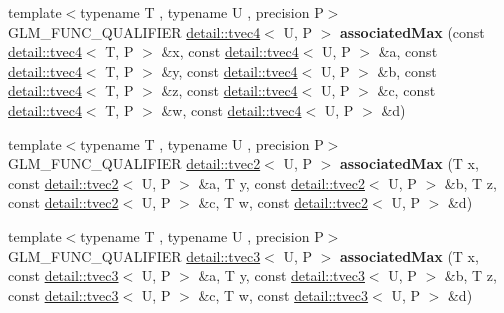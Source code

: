 \begin{DoxyCompactItemize}
\item 
{\footnotesize template$<$typename T , typename U , precision P$>$ }\\G\+L\+M\+\_\+\+F\+U\+N\+C\+\_\+\+Q\+U\+A\+L\+I\+F\+I\+ER \hyperlink{structglm_1_1detail_1_1tvec4}{detail\+::tvec4}$<$ U, P $>$ {\bfseries associated\+Max} (const \hyperlink{structglm_1_1detail_1_1tvec4}{detail\+::tvec4}$<$ T, P $>$ \&x, const \hyperlink{structglm_1_1detail_1_1tvec4}{detail\+::tvec4}$<$ U, P $>$ \&a, const \hyperlink{structglm_1_1detail_1_1tvec4}{detail\+::tvec4}$<$ T, P $>$ \&y, const \hyperlink{structglm_1_1detail_1_1tvec4}{detail\+::tvec4}$<$ U, P $>$ \&b, const \hyperlink{structglm_1_1detail_1_1tvec4}{detail\+::tvec4}$<$ T, P $>$ \&z, const \hyperlink{structglm_1_1detail_1_1tvec4}{detail\+::tvec4}$<$ U, P $>$ \&c, const \hyperlink{structglm_1_1detail_1_1tvec4}{detail\+::tvec4}$<$ T, P $>$ \&w, const \hyperlink{structglm_1_1detail_1_1tvec4}{detail\+::tvec4}$<$ U, P $>$ \&d)\hypertarget{namespaceglm_aa9c28699144939e12f1b1261b1939688}{}\label{namespaceglm_aa9c28699144939e12f1b1261b1939688}

\item 
{\footnotesize template$<$typename T , typename U , precision P$>$ }\\G\+L\+M\+\_\+\+F\+U\+N\+C\+\_\+\+Q\+U\+A\+L\+I\+F\+I\+ER \hyperlink{structglm_1_1detail_1_1tvec2}{detail\+::tvec2}$<$ U, P $>$ {\bfseries associated\+Max} (T x, const \hyperlink{structglm_1_1detail_1_1tvec2}{detail\+::tvec2}$<$ U, P $>$ \&a, T y, const \hyperlink{structglm_1_1detail_1_1tvec2}{detail\+::tvec2}$<$ U, P $>$ \&b, T z, const \hyperlink{structglm_1_1detail_1_1tvec2}{detail\+::tvec2}$<$ U, P $>$ \&c, T w, const \hyperlink{structglm_1_1detail_1_1tvec2}{detail\+::tvec2}$<$ U, P $>$ \&d)\hypertarget{namespaceglm_aaa37fcc1597ced974a35c9765128c888}{}\label{namespaceglm_aaa37fcc1597ced974a35c9765128c888}

\item 
{\footnotesize template$<$typename T , typename U , precision P$>$ }\\G\+L\+M\+\_\+\+F\+U\+N\+C\+\_\+\+Q\+U\+A\+L\+I\+F\+I\+ER \hyperlink{structglm_1_1detail_1_1tvec3}{detail\+::tvec3}$<$ U, P $>$ {\bfseries associated\+Max} (T x, const \hyperlink{structglm_1_1detail_1_1tvec3}{detail\+::tvec3}$<$ U, P $>$ \&a, T y, const \hyperlink{structglm_1_1detail_1_1tvec3}{detail\+::tvec3}$<$ U, P $>$ \&b, T z, const \hyperlink{structglm_1_1detail_1_1tvec3}{detail\+::tvec3}$<$ U, P $>$ \&c, T w, const \hyperlink{structglm_1_1detail_1_1tvec3}{detail\+::tvec3}$<$ U, P $>$ \&d)\hypertarget{namespaceglm_a92b6d5f6dedb0372fb0fb6fbff888671}{}\label{namespaceglm_a92b6d5f6dedb0372fb0fb6fbff888671}


\end{DoxyCompactItemize}
